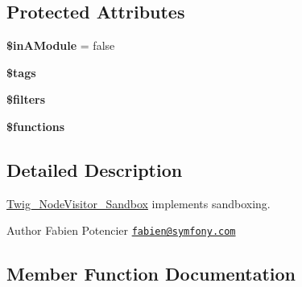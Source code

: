 \subsection*{Protected Attributes}
\begin{DoxyCompactItemize}
\item 
{\bfseries \$in\+A\+Module} = false\hypertarget{classTwig__NodeVisitor__Sandbox_ad2b568a6e7b832bc94abe78329ac20ae}{}\label{classTwig__NodeVisitor__Sandbox_ad2b568a6e7b832bc94abe78329ac20ae}

\item 
{\bfseries \$tags}\hypertarget{classTwig__NodeVisitor__Sandbox_a443eb35b3d6e7ec3c2887785d7826fa2}{}\label{classTwig__NodeVisitor__Sandbox_a443eb35b3d6e7ec3c2887785d7826fa2}

\item 
{\bfseries \$filters}\hypertarget{classTwig__NodeVisitor__Sandbox_af57a68758edbd1a4e26cdf8e1b6a8df8}{}\label{classTwig__NodeVisitor__Sandbox_af57a68758edbd1a4e26cdf8e1b6a8df8}

\item 
{\bfseries \$functions}\hypertarget{classTwig__NodeVisitor__Sandbox_a647470a0eccdb8d273a4d81ed443d11e}{}\label{classTwig__NodeVisitor__Sandbox_a647470a0eccdb8d273a4d81ed443d11e}

\end{DoxyCompactItemize}


\subsection{Detailed Description}
\hyperlink{classTwig__NodeVisitor__Sandbox}{Twig\+\_\+\+Node\+Visitor\+\_\+\+Sandbox} implements sandboxing.

\begin{DoxyAuthor}{Author}
Fabien Potencier \href{mailto:fabien@symfony.com}{\tt fabien@symfony.\+com} 
\end{DoxyAuthor}


\subsection{Member Function Documentation}

